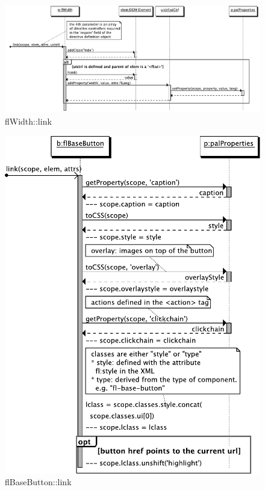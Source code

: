 \begin{figure}[htb]
    \centering
    \includegraphics{figures/design/seqdia/width-link.pdf}
    \caption{flWidth::link}
    \label{fig:design-seqdia-width-link}
\end{figure}

\begin{figure}[htb]
    \centering
    \includegraphics{figures/design/seqdia/basebutton-link.pdf}
    \caption{flBaseButton::link}
    \label{fig:design-seqdia-basebutton-link}
\end{figure}

